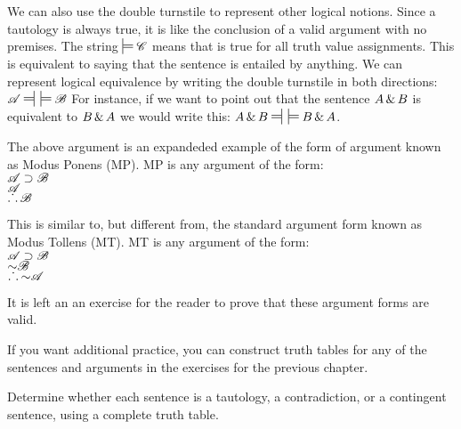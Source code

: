 We can also use the double turnstile to represent other logical notions. Since a tautology is always true, it is like the conclusion of a valid argument with no premises. The string $\sdtstile{}{}\script{C}$ means that  is true for all truth value assignments. This is equivalent to saying that the sentence is entailed by anything. We can represent logical equivalence by writing the double turnstile in both directions: $\script{A} \ndststile{}{} \hspace{.5em} \sdtstile{}{} \script{B}$ For instance, if we want to point out that the sentence $A \,\&\, B$ is equivalent to $B \,\&\, A$ we would write this: $A \eand B \ndststile{}{} \hspace{.5em} \sdtstile{}{} B \eand A$. 

The above argument is an expandeded example of the form of argument known as Modus Ponens (MP). MP is any argument of the 
form: \\
$\mathscr{A} \supset \mathscr{B}$ \\
$\mathscr{A}$ \\
$\ldotp\dot{}\,\ldotp \mathscr{B}$ 

This is similar to, but different from, the standard argument form known as Modus Tollens (MT). MT is any argument of the form: \\
$\mathscr{A} \supset \mathscr{B}$ \\
$\mathord{\sim} \mathscr{B}$ \\
$\ldotp\dot{}\,\ldotp \mathord{\sim} \mathscr{A}$ 

It is left an an exercise for the reader to prove that these argument forms are valid.


\practiceproblems

If you want additional practice, you can construct truth tables for any of the sentences and arguments in the exercises for the previous chapter.


\noindent\problempart Determine whether each sentence is a tautology, a contradiction, or a contingent sentence, using a complete truth table.

